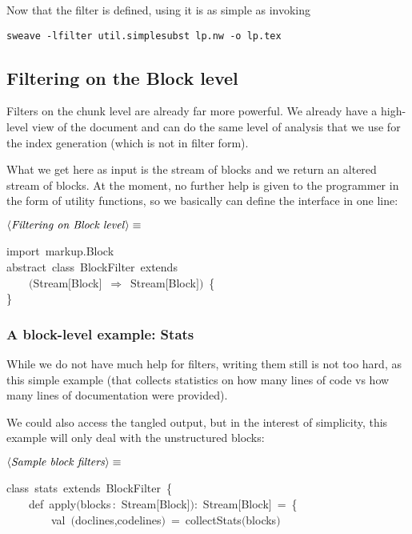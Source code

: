 \documentclass[a4paper,12pt]{article}
\begin{document}
Now that the filter is defined, using it is as simple as invoking

\begin{verbatim}
sweave -lfilter util.simplesubst lp.nw -o lp.tex
\end{verbatim}

\subsection{Filtering on the Block level}
Filters on the chunk level are already far more powerful. We already
have a high-level view of the document and can do the same level of analysis
that we use for the index generation (which is not in filter form).

What we get here as input is the stream of blocks and we return an altered
stream of blocks. At the moment, no further help is given to the programmer
in the form of utility functions, so we basically can define the interface
in one line:

$\left<\mbox{\emph{Filtering on Block level}}\right>\equiv$
\begin{program}{\vem import}~markup.Block
\\{\vem abstract}~{\vem class}~BlockFilter~{\vem extends}
\\~~~~$($Stream$[$Block$]$~$\Rightarrow$~Stream$[$Block$]$$)$~{\small\{}
\\{\small\}}
\\[0.5em]\end{program}



\subsubsection{A block-level example: Stats}
While we do not have much help for filters, writing them still is not
too hard, as this simple example (that collects statistics on how
many lines of code vs how many lines of documentation were provided).

We could also access the tangled output, but in the interest of simplicity,
this example will only deal with the unstructured blocks:

$\left<\mbox{\emph{Sample block filters}}\right>\equiv$
\begin{program}{\vem class}~stats~{\vem extends}~BlockFilter~{\small\{}
\\~~~~{\vem def}~apply$($blocks\,{\rm :}~Stream$[$Block$]$$)${\rm :}~Stream$[$Block$]$~=~{\small\{}
\\~~~~~~~~{\vem val}~$($doclines,codelines$)$~=~collectStats$($blocks$)$
\\[0.5em]\end{program}
\end{document}

